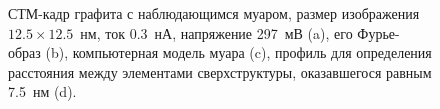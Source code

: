 \documentclass[a4paper, 12pt]{article}
\begin{document}
\begin{figure}[H]
	\centering
	\caption{СТМ-кадр графита с наблюдающимся муаром, размер изображения $12.5\times12.5$~нм, ток 0.3~нА, напряжение 297~мВ (a), его Фурье-образ (b), компьютерная модель муара (c), профиль для определения расстояния между элементами сверхструктуры, оказавшегося равным 7.5~нм (d).}
	\label{fig:2_muar}
\end{figure}
\end{document}

